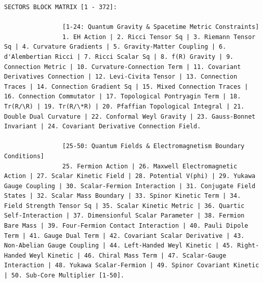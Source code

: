 \documentclass[11pt,a4paper]{article}
\makeatletter
\def\ttfamily{\@noligs\fontfamily\ttdefault\selectfont\sloppy}
\makeatother
\begin{document}
\begin{tcolorbox}
\begin{otherlanguage}{english}
\begin{lstlisting}[basicstyle=\scriptsize\ttfamily, breaklines=true, columns=fullflexible]
				SECTORS BLOCK MATRIX [1 - 372]:
				
				[1-24: Quantum Gravity & Spacetime Metric Constraints]
				1. EH Action | 2. Ricci Tensor Sq | 3. Riemann Tensor Sq | 4. Curvature Gradients | 5. Gravity-Matter Coupling | 6. d'Alembertian Ricci | 7. Ricci Scalar Sq | 8. f(R) Gravity | 9. Connection Metric | 10. Curvature-Connection Term | 11. Covariant Derivatives Connection | 12. Levi-Civita Tensor | 13. Connection Traces | 14. Connection Gradient Sq | 15. Mixed Connection Traces | 16. Connection Commutator | 17. Topological Pontryagin Term | 18. Tr(R/\R) | 19. Tr(R/\*R) | 20. Pfaffian Topological Integral | 21. Double Dual Curvature | 22. Conformal Weyl Gravity | 23. Gauss-Bonnet Invariant | 24. Covariant Derivative Connection Field.
				
				[25-50: Quantum Fields & Electromagnetism Boundary Conditions]
				25. Fermion Action | 26. Maxwell Electromagnetic Action | 27. Scalar Kinetic Field | 28. Potential V(phi) | 29. Yukawa Gauge Coupling | 30. Scalar-Fermion Interaction | 31. Conjugate Field States | 32. Scalar Mass Boundary | 33. Spinor Kinetic Term | 34. Field Strength Tensor Sq | 35. Scalar Kinetic Metric | 36. Quartic Self-Interaction | 37. Dimensionful Scalar Parameter | 38. Fermion Bare Mass | 39. Four-Fermion Contact Interaction | 40. Pauli Dipole Term | 41. Gauge Dual Term | 42. Covariant Scalar Derivative | 43. Non-Abelian Gauge Coupling | 44. Left-Handed Weyl Kinetic | 45. Right-Handed Weyl Kinetic | 46. Chiral Mass Term | 47. Scalar-Gauge Interaction | 48. Yukawa Scalar-Fermion | 49. Spinor Covariant Kinetic | 50. Sub-Core Multiplier [1-50].
				

\end{lstlisting}
\end{otherlanguage}
\end{tcolorbox}
\end{document}
